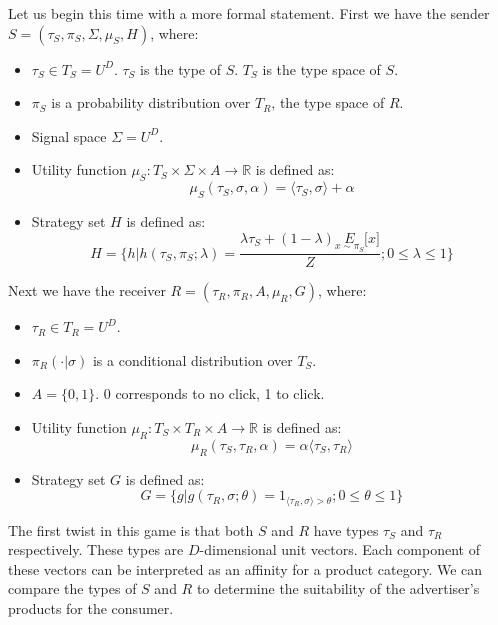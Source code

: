 \documentclass{article}
\begin{document}
Let us begin this time with a more formal statement. First we have the sender $S = (\tau_S, \pi_S, \Sigma, \mu_S, H)$, where:
\begin{itemize}
	\item $\tau_S \in T_S = U^D$. $\tau_S$ is the type of $S$. $T_S$ is the type space of $S$.
	\item $\pi_S$ is a probability distribution over $T_R$, the type space of $R$.
	\item Signal space $\Sigma = U^D$.
	\item Utility function $\mu_S: T_S \times \Sigma \times A \rightarrow \mathbb{R}$ is defined as:
	\begin{equation}
		\mu_S(\tau_S, \sigma, \alpha) = \langle \tau_S, \sigma \rangle + \alpha
	\end{equation}
	\item Strategy set $H$ is defined as:
	\begin{equation}
		H = \lbrace h | h(\tau_S, \pi_S; \lambda) = \frac{\lambda \tau_S + (1-\lambda)\underset{x\sim\pi_S}{E}\lbrack x \rbrack}{Z}; 0 \le \lambda \le 1 \rbrace
	\end{equation}
\end{itemize}

\noindent Next we have the receiver $R = (\tau_R, \pi_R, A, \mu_R, G)$, where:
\begin{itemize}
	\item $\tau_R \in T_R = U^D$.
	\item $\pi_R(\cdot|\sigma)$ is a conditional distribution over $T_S$.
	\item $A = \lbrace 0,1 \rbrace$. 0 corresponds to no click, 1 to click.
	\item Utility function $\mu_R: T_S \times T_R \times A \rightarrow \mathbb{R}$ is defined as:
	\begin{equation}
		\mu_R(\tau_S, \tau_R, \alpha) = \alpha \langle \tau_S, \tau_R \rangle
	\end{equation}
	\item Strategy set $G$ is defined as:
	\begin{equation}
		G = \lbrace g | g(\tau_R, \sigma; \theta) = 1_{\langle \tau_R, \sigma \rangle > \theta}; 0 \le \theta \le 1 \rbrace
	\end{equation}
\end{itemize}

\noindent The first twist in this game is that both $S$ and $R$ have types $\tau_S$ and $\tau_R$ respectively. These types are $D$-dimensional unit vectors. Each component of these vectors can be interpreted as an affinity for a product category. We can compare the types of $S$ and $R$ to determine the suitability of the advertiser's products for the consumer. 
\end{document}
